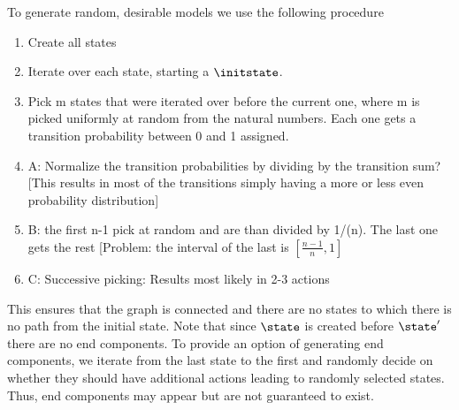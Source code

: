 To generate random, desirable models we use the following procedure \label{procedure:randomRandom}
\begin{enumerate}
 \item Create all states
 \item Iterate over each state, starting a $\initstate$.
 \item Pick m states that were iterated over before the current one, where m is picked uniformly at random from the natural numbers. Each one gets a transition probability between 0 and 1 assigned.
 \item A: Normalize the transition probabilities by dividing by the transition sum? [This results in most of the transitions simply having a more or less even probability distribution]
 \item B: the first n-1 pick at random and are than divided by 1/(n). The last one gets the rest [Problem: the interval of the last is $[\frac{n-1}{n}, 1]$
 \item C: Successive picking: Results most likely in 2-3 actions
 
\end{enumerate}
This ensures that the graph is connected and there are no states to which there is no path from the initial state. Note that since $\state$ is created before $\state'$ there are no end components. To provide an option of generating end components, we iterate from the last state to the first and randomly decide on whether they should have additional actions leading to randomly selected states. Thus, end components may appear but are not guaranteed to exist.

